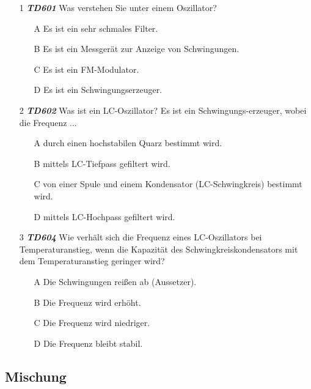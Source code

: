 \begin{enumerate} 
	\item[1] \emph{\textbf{TD601}} Was verstehen Sie unter einem Oszillator?
	\begin{enumerate}
	\itemsep1pt\parskip0pt
		\item[A] Es ist ein sehr schmales Filter.
		\item[B] Es ist ein Messgerät zur Anzeige von Schwingungen.
		\item[C] Es ist ein FM-Modulator.
		\item[D] Es ist ein Schwingungserzeuger.
	\end{enumerate} 
	\item[2] \emph{\textbf{TD602}}  Was ist ein LC-Oszillator? Es ist ein Schwingungs-erzeuger, wobei die Frequenz ...
	\begin{enumerate}
	\itemsep1pt\parskip0pt
		\item[A] durch einen hochstabilen Quarz bestimmt wird.
		\item[B] mittels LC-Tiefpass gefiltert wird.
		\item[C] von einer Spule und einem Kondensator (LC-Schwingkreis) bestimmt wird.
		\item[D] mittels LC-Hochpass gefiltert wird.
	\end{enumerate} 
	\item[3] \emph{\textbf{TD604}}  Wie verhält sich die Frequenz eines LC-Oszillators bei Temperaturanstieg, wenn die Kapazität des Schwingkreiskondensators mit dem Temperaturanstieg geringer wird?
	\begin{enumerate}
	\itemsep1pt\parskip0pt
		\item[A] Die Schwingungen reißen ab (Aussetzer).
		\item[B] Die Frequenz wird erhöht.
		\item[C] Die Frequenz wird niedriger.
		\item[D] Die Frequenz bleibt stabil.
	\end{enumerate} 
\end{enumerate}

\subsection*{Mischung}


